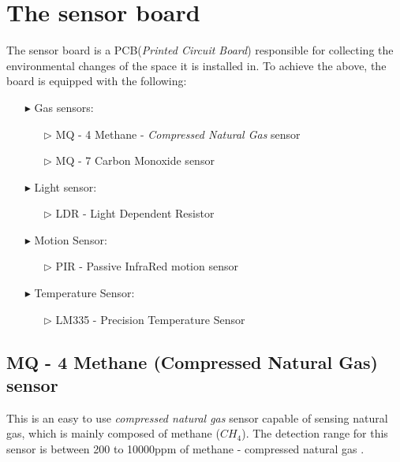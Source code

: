 \documentclass[12pt,a4paper]{report}
\begin{document}
\section{The sensor board}
%
The sensor board is a PCB(\textit{Printed Circuit Board}) responsible for collecting the environmental changes of the space it is installed in. To achieve the above, the board is equipped with the following:
%
\begin{itemize}
\item[$\blacktriangleright$]Gas sensors:
	\begin{itemize}
	\item[$\triangleright$] MQ - 4 Methane - \textit{Compressed Natural Gas} sensor
	\item[$\triangleright$] MQ - 7 Carbon Monoxide  sensor
	\end{itemize}
\item[$\blacktriangleright$]Light sensor:
	\begin{itemize}
	\item[$\triangleright$]LDR - Light Dependent Resistor
	\end{itemize}
\item[$\blacktriangleright$]Motion Sensor:
	\begin{itemize}
	\item[$\triangleright$]PIR - Passive InfraRed motion sensor 
	\end{itemize}
\item[$\blacktriangleright$]Temperature Sensor:
	\begin{itemize}
	\item[$\triangleright$]LM335 - Precision Temperature Sensor
	\end{itemize}
\end{itemize}
%
\subsection{MQ - 4 Methane (Compressed Natural Gas) sensor}
%
This is an easy to use \emph{compressed natural gas} sensor capable of sensing natural gas, which is mainly composed of methane ($CH_4$). The detection range for this sensor is between 200 to 10000ppm of methane  - compressed natural gas \cite{website:mq4}.
\end{document}
